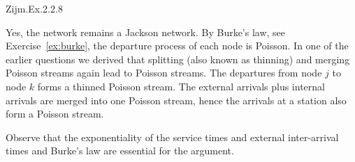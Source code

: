 \begin{exercise}
Zijm.Ex.2.2.8
\begin{solution}
  Yes, the network remains a Jackson network. By Burke's law, see Exercise~\ref{ex:burke}, the
  departure process of each node is Poisson. In one of the earlier
  questions we derived that splitting (also known as thinning) and
  merging Poisson streams again lead to Poisson streams. The
  departures from node $j$ to node $k$ forms a thinned Poisson
  stream. The external arrivals plus internal arrivals are merged into
  one Poisson stream, hence the arrivals at a station also form a Poisson stream.

  Observe that the exponentiality of the service times and external
  inter-arrival times and Burke's law are essential for the argument.
\end{solution}
\end{exercise}

